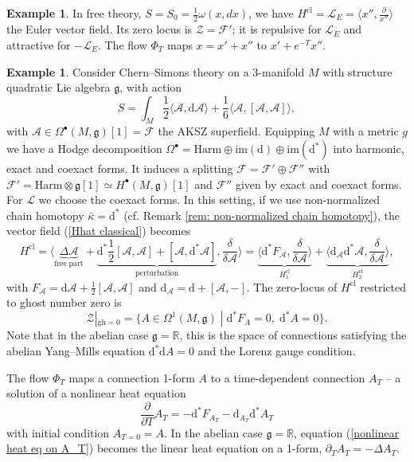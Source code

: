 \documentclass{amsart}
\theoremstyle{plain} %
\theoremstyle{definition}
\newtheorem{expl}[thm]{Example}
\theoremstyle{remark}
\newcommand{\g}{\mathfrak{g}}
\newcommand{\mc}{\mathcal}
\newcommand{\mr}{\mathrm}
\newcommand{\bt}{\bullet}
\newcommand{\bl}{\color{blue}}
\newcommand{\F}{\mathcal{F}}
\newcommand{\LL}{\mathcal{L}}
\newcommand{\RR}{\mathbb{R}}
\newcommand{\dd}{\partial}
\newcommand{\cl}{\mathrm{cl}}
\newcommand{\dr}{\mathrm{d}}
\begin{document}
\begin{expl}
    In free theory, $S=S_0=\frac12\omega(x,dx)$, we have $H^\cl=\LL_E=\langle x'',\frac{\dd}{x''} \rangle$ the Euler vector field. Its zero locus is $\mc{Z}=\F'$; it is repulsive for $\LL_E$ and attractive for $-\LL_E$. The flow $\Phi_T$ maps $x=x'+x''$ to $x'+e^{-T}x''$.
\end{expl}
\begin{expl}\label{example: Chern-Simons H^cl in Lorenz gauge}
    Consider Chern--Simons theory on a 3-manifold $M$ with structure quadratic Lie algebra $\g$, with action 
    \begin{equation}
    S=\int_M \frac12 \langle \mc{A},\dr \mc{A} \rangle+\frac16 \langle \mc{A},[\mc{A},\mc{A}] \rangle,
    \end{equation}
    with $\mc{A}\in \Omega^\bt(M,\g)[1]=\F$ the AKSZ superfield. Equipping $M$ with a metric $g$ we have a Hodge decomposition
    $\Omega^\bt=\mr{Harm}\oplus \mr{im}(\dr)\oplus \mr{im}(\dr^*)$ into harmonic, exact and coexact forms. It induces a splitting $\F=\F'\oplus \F''$ with $\F'=\mr{Harm}\otimes \g[1]\simeq H^\bt(M,\g)[1]$ and $\F''$ given by exact and coexact forms. For $\LL$ we choose the coexact forms. In this setting, if we use non-normalized chain homotopy $\bar\kappa=\dr^*$ (cf. Remark \ref{rem: non-normalized chain homotopy}), the vector field (\ref{Hhat classical}) becomes 
    \begin{equation}
        H^\cl=\langle \underbrace{\Delta \mc{A}}_{\mr{free\;part}}+\underbrace{\dr^*\frac12[\mc{A},\mc{A}]+[\mc{A},\dr^*\mc{A}]}_\mr{perturbation},\frac{\delta}{\delta\mc{A}} \rangle
        =
       \underbrace{\langle \dr^* F_\mc{A},\frac{\delta}{\delta\mc{A}} \rangle}_{H^\cl_1}+
        \underbrace{\langle \dr_\mc{A} \dr^*\mc{A},\frac{\delta}{\delta \mc{A}} \rangle}_{H^\cl_2},
    \end{equation}
    with $F_\mc{A}=\dr\mc{A}+\frac12[\mc{A},\mc{A}]$ and $\dr_\mc{A}=\dr+[\mc{A},-]$. 
    The zero-locus of $H^\cl$ restricted to ghost number zero is
    \begin{equation}
        \mc{Z}|_{\mr{gh}=0}=\{A\in \Omega^1(M,\g)\;|\; \dr^*F_A=0,\; \dr^*A=0\}.
    \end{equation}
    Note that in the abelian case $\g=\mathbb{R}$, this is the space of connections satisfying the abelian Yang--Mills %
    equation $\dr^* \dr A=0$ and the Lorenz gauge condition.

    The flow $\Phi_T$ maps a connection 1-form $A$ to a time-dependent connection $A_T$ -- a solution of a nonlinear heat equation
    \begin{equation}\label{nonlinear heat eq on A_T}
        \frac{\partial}{\partial T} A_T = - \dr^* F_{A_T}-\dr_{A_T} \dr^* {A_T}
    \end{equation}
    with initial condition $A_{T=0}=A$. In the abelian case $\g=\RR$, equation (\ref{nonlinear heat eq on A_T}) becomes the linear heat equation on a 1-form, $\partial_T A_T=-\Delta A_T$.
\end{expl}
\end{document}
